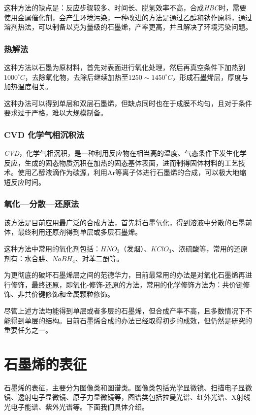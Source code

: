 这种方法的缺点是：反应步骤较多、时间长、脱氢效率不高，合成\textit{HBC}时，需要使用金属催化剂，会产生环境污染，一种改进的方法是通过乙醇和钠作原料，通过溶剂热法，可以制备以克为量级的石墨烯，产率更高，并且解决了环境污染问题。

\subsubsection{热解法}

这种方法以石墨为原材料，首先对表面进行氧化处理，然后再真空条件下加热到$1000^\circ C$，去除氧化物，去除后继续加热至$1250\sim 1450^\circ C$，形成石墨烯层，厚度与加热温度相关。

这种办法可以得到单层和双层石墨烯，但缺点同时也在于成膜不均匀，且对于条件要求过于严格，难以大规模制备。

\subsubsection{CVD 化学气相沉积法}

\textit{CVD}，化学气相沉积，是一种利用反应物在相当高的温度、气态条件下发生化学反应，生成的固态物质沉积在加热的固态基体表面，进而制得固体材料的工艺技术。使用乙醇液滴作为碳源，利用Ar等离子体进行石墨烯的合成，可以极大地缩短反应时间。

\subsubsection{氧化—分散—还原法}

该方法是目前应用最广泛的合成方法，首先将石墨氧化，得到溶液中分散的石墨前体，最终利用还原剂得到单层或多层石墨烯。

这种方法中常用的氧化剂包括：$HNO_3$（发烟）、$KClO_3$、浓硫酸等，常用的还原剂有：水合肼、$NaBH_4$、对苯二酚等。

为更彻底的破坏石墨烯层之间的范德华力，目前最常用的办法是对氧化石墨烯再进行修饰，最终还原，即氧化-修饰-还原的方法，常用的化学修饰方法为：共价键修饰、非共价键修饰和金属颗粒修饰。

尽管上述方法均能得到单层或者多层的石墨烯，但合成产率不高，且多数情况下不能得到单层的结构。目前石墨烯合成的办法已经取得初步的成效，但仍然是研究的重要任务之一。


\section{石墨烯的表征}

石墨烯的表征，主要分为图像类和图谱类\cite{RN11}。图像类包括光学显微镜、扫描电子显微镜、透射电子显微镜、原子力显微镜等，图谱类包括拉曼光谱、红外光谱、X射线光电子能谱、紫外光谱等。下面我们具体介绍。

